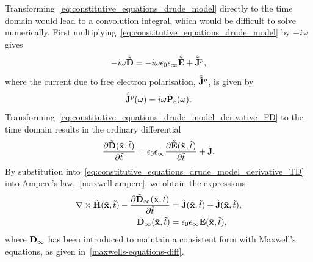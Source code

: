 Transforming~\eqref{eq:constitutive_equations_drude_model} directly to the time domain would lead to a convolution integral, which would be difficult to solve numerically. First multiplying~\eqref{eq:constitutive_equations_drude_model} by $ -i \omega$ gives
\begin{equation}
\label{eq:constitutive_equations_drude_model_derivative_FD}
- i \omega \hat{\tilde{\mathbf{D}}} = -i \omega \epsilon_0 \epsilon_{\infty} \hat{\tilde{\mathbf{E}}} + \hat{\tilde{\mathbf{J}}}^p,
\end{equation}
where the current due to free electron polarisation, $\hat{\tilde{\mathbf{J}}}^p$, is given by
\begin{equation}
\label{eq:drude-free-elect-current-defn}
\hat{\tilde{\mathbf{J}}}^p(\omega) = i \omega \hat{\mathbf{P}}_e(\omega) .
\end{equation}
Transforming~\eqref{eq:constitutive_equations_drude_model_derivative_FD} to the time domain results in the ordinary differential
\begin{equation}
\label{eq:constitutive_equations_drude_model_derivative_TD}
\frac{\partial \tilde{\mathbf{D}} (\tilde{\mathbf{x}},\tilde{t}) }{\partial \tilde{t}}= \epsilon_0 \epsilon_{\infty} \frac{\partial \tilde{\mathbf{E}} (\tilde{\mathbf{x}}, \tilde{t}) }{\partial \tilde{t}} + \tilde{\mathbf{J}} .
\end{equation}
By substitution into~\eqref{eq:constitutive_equations_drude_model_derivative_TD} into Ampere's law,~\eqref{maxwell-ampere}, we obtain the expressions
\begin{subequations}
\label{eq:drude-ampere}
    \begin{align}
        \nabla \times \tilde{\mathbf{H}}(\tilde{\mathbf{x}},\tilde{t}) - \frac{\partial\tilde{\mathbf{D}}_{\infty}(\tilde{\mathbf{x}}, \tilde{t})}{\partial \tilde{t}} &= \tilde{\mathbf{J}}(\tilde{\mathbf{x}},\tilde{t}) + \tilde{\mathbf{J}}(\tilde{\mathbf{x}},\tilde{t}) , \\
        \tilde{\mathbf{D}}_{\infty}(\tilde{\mathbf{x}}, \tilde{t}) &= \epsilon_0 \epsilon_{\infty} \tilde{\mathbf{E}}(\tilde{\mathbf{x}}, \tilde{t}),
    \end{align}
\end{subequations}
where $\tilde{\mathbf{D}}_{\infty}$ has been introduced to maintain a consistent form with Maxwell's equations, as given in~\eqref{maxwells-equations-diff}.

